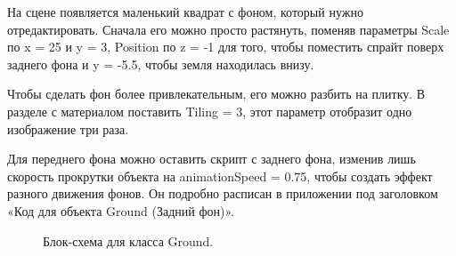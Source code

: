 \documentclass[14pt, oneside]{altsu-report}
\begin{document}
На сцене появляется маленький квадрат с фоном, который нужно отредактировать. Сначала его можно просто растянуть, поменяв параметры Scale по x = 25 и y = 3, Position по z = -1 для того, чтобы поместить спрайт поверх заднего фона и y = -5.5, чтобы земля находилась внизу. 

Чтобы сделать фон более привлекательным, его можно разбить на плитку. В разделе с материалом поставить Tiling = 3, этот параметр отобразит одно изображение три раза.  

Для переднего фона можно оставить скрипт с заднего фона, изменив лишь скорость прокрутки объекта на animationSpeed = 0.75, чтобы создать эффект разного движения фонов. Он подробно расписан в приложении под заголовком «Код для объекта Ground (Задний фон)».

\begin{figure}[H]
\caption{Блок-схема для класса Ground.}
\end{figure}
\end{document}
